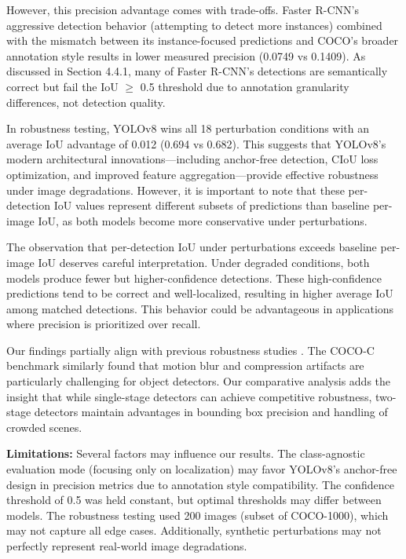 \documentclass[conference]{IEEEtran}
\begin{document}
However, this precision advantage comes with trade-offs. Faster R-CNN's aggressive detection behavior (attempting to detect more instances) combined with the mismatch between its instance-focused predictions and COCO's broader annotation style results in lower measured precision (0.0749 vs 0.1409). As discussed in Section 4.4.1, many of Faster R-CNN's detections are semantically correct but fail the IoU $\geq$ 0.5 threshold due to annotation granularity differences, not detection quality.

In robustness testing, YOLOv8 wins all 18 perturbation conditions with an average IoU advantage of 0.012 (0.694 vs 0.682). This suggests that YOLOv8's modern architectural innovations---including anchor-free detection, CIoU loss optimization, and improved feature aggregation---provide effective robustness under image degradations. However, it is important to note that these per-detection IoU values represent different subsets of predictions than baseline per-image IoU, as both models become more conservative under perturbations.

The observation that per-detection IoU under perturbations exceeds baseline per-image IoU deserves careful interpretation. Under degraded conditions, both models produce fewer but higher-confidence detections. These high-confidence predictions tend to be correct and well-localized, resulting in higher average IoU among matched detections. This behavior could be advantageous in applications where precision is prioritized over recall.

Our findings partially align with previous robustness studies \cite{michaelis2019dragon, hendrycks2019benchmarking}. The COCO-C benchmark similarly found that motion blur and compression artifacts are particularly challenging for object detectors. Our comparative analysis adds the insight that while single-stage detectors can achieve competitive robustness, two-stage detectors maintain advantages in bounding box precision and handling of crowded scenes.

\textbf{Limitations:} Several factors may influence our results. The class-agnostic evaluation mode (focusing only on localization) may favor YOLOv8's anchor-free design in precision metrics due to annotation style compatibility. The confidence threshold of 0.5 was held constant, but optimal thresholds may differ between models. The robustness testing used 200 images (subset of COCO-1000), which may not capture all edge cases. Additionally, synthetic perturbations may not perfectly represent real-world image degradations.
\end{document}

